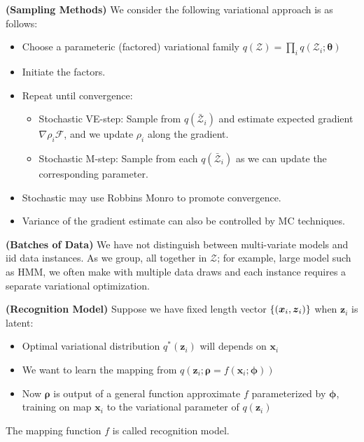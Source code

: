 \begin{remark}{\textbf{(Sampling Methods)}}
    We consider the following  variational approach is as follows:
    \begin{itemize}
        \item Choose a parameteric (factored) variational family $q(\mathcal{Z}) = \prod_i q(\mathcal{Z}_i;\boldsymbol \theta)$
        \item Initiate the factors. 
        \item Repeat until convergence:
        \begin{itemize}
            \item Stochastic VE-step: Sample from $q(\bar{\mathcal{Z}}_i)$ and estimate expected gradient $\nabla \rho_i\mathcal{F}$, and we update $\rho_i$ along the gradient. 
            \item Stochastic M-step: Sample from each $q(\bar{\mathcal{Z}}_i)$ as we can update the corresponding parameter. 
        \end{itemize}
        \item Stochastic may use Robbins Monro to promote convergence. 
        \item Variance of the gradient estimate can also be controlled by MC techniques. 
    \end{itemize}
\end{remark}

\begin{remark}{\textbf{(Batches of Data)}}
    We have not distinguish between multi-variate models and iid data instances. As we group, all together in $\mathcal{Z}$; for example, large model such as HMM, we often make with multiple data draws and each instance requires a separate variational optimization. 
\end{remark}

\begin{definition}{\textbf{(Recognition Model)}}    
    Suppose we have fixed length vector $\left\{ (\boldsymbol x_i, \boldsymbol z_i) \right\}$ when $\boldsymbol z_i$ is latent:
    \begin{itemize}
        \item Optimal variational distribution $q^*(\boldsymbol z_i)$ will depends on $\boldsymbol x_i$
        \item We want to learn the mapping from $q(\boldsymbol z_i;\boldsymbol \rho = f(\boldsymbol x_i;\boldsymbol \phi))$
        \item Now $\boldsymbol \rho$ is output of a general function approximate $f$ parameterized by $\boldsymbol \phi$, training on map $\boldsymbol x_i$ to the variational parameter of $q(\boldsymbol z_i)$
    \end{itemize}
    The mapping function $f$ is called recognition model.
\end{definition}

